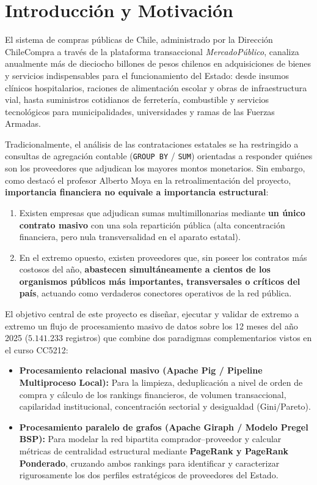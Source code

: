 \documentclass[11pt,a4paper]{article}
\begin{document}
\section{Introducción y Motivación}

El sistema de compras públicas de Chile, administrado por la Dirección ChileCompra a través de la plataforma transaccional \textit{MercadoPúblico}, canaliza anualmente más de dieciocho billones de pesos chilenos en adquisiciones de bienes y servicios indispensables para el funcionamiento del Estado: desde insumos clínicos hospitalarios, raciones de alimentación escolar y obras de infraestructura vial, hasta suministros cotidianos de ferretería, combustible y servicios tecnológicos para municipalidades, universidades y ramas de las Fuerzas Armadas.

Tradicionalmente, el análisis de las contrataciones estatales se ha restringido a consultas de agregación contable (\texttt{GROUP BY} / \texttt{SUM}) orientadas a responder quiénes son los proveedores que adjudican los mayores montos monetarios. Sin embargo, como destacó el profesor Alberto Moya en la retroalimentación del proyecto, \textbf{importancia financiera no equivale a importancia estructural}:
\begin{enumerate}[label=\arabic*.]
    \item Existen empresas que adjudican sumas multimillonarias mediante \textbf{un único contrato masivo} con una sola repartición pública (alta concentración financiera, pero nula transversalidad en el aparato estatal).
    \item En el extremo opuesto, existen proveedores que, sin poseer los contratos más costosos del año, \textbf{abastecen simultáneamente a cientos de los organismos públicos más importantes, transversales o críticos del país}, actuando como verdaderos conectores operativos de la red pública.
\end{enumerate}

El objetivo central de este proyecto es diseñar, ejecutar y validar de extremo a extremo un flujo de procesamiento masivo de datos sobre los 12 meses del año 2025 ($5.141.233$ registros) que combine dos paradigmas complementarios vistos en el curso CC5212:
\begin{itemize}
    \item \textbf{Procesamiento relacional masivo (Apache Pig / Pipeline Multiproceso Local):} Para la limpieza, deduplicación a nivel de orden de compra y cálculo de los rankings financieros, de volumen transaccional, capilaridad institucional, concentración sectorial y desigualdad (Gini/Pareto).
    \item \textbf{Procesamiento paralelo de grafos (Apache Giraph / Modelo Pregel BSP):} Para modelar la red bipartita comprador--proveedor y calcular métricas de centralidad estructural mediante \textbf{PageRank y PageRank Ponderado}, cruzando ambos rankings para identificar y caracterizar rigurosamente los dos perfiles estratégicos de proveedores del Estado.
\end{itemize}
\end{document}
